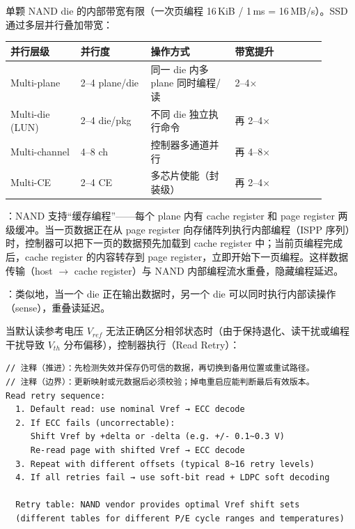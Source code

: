 单颗 NAND die 的内部带宽有限（一次页编程 16\,KiB / 1\,ms = 16\,MB/s）。SSD 通过多层并行叠加带宽：

\begin{longtable}{L{0.2\linewidth}L{0.2\linewidth}L{0.24\linewidth}L{0.26\linewidth}}
\toprule
并行层级 & 并行度 & 操作方式 & 带宽提升 \\
\midrule
Multi-plane & 2--4 plane/die & 同一 die 内多 plane 同时编程/读 & 2--4$\times$ \\\tablerowrule
Multi-die (LUN) & 2--4 die/pkg & 不同 die 独立执行命令 & 再 2--4$\times$ \\\tablerowrule
Multi-channel & 4--8 ch & 控制器多通道并行 & 再 4--8$\times$ \\\tablerowrule
Multi-CE & 2--4 CE & 多芯片使能（封装级） & 再 2--4$\times$ \\
\bottomrule
\end{longtable}

：NAND 支持“缓存编程”——每个 plane 内有 cache register 和 page register 两级缓冲。当一页数据正在从 page register 向存储阵列执行内部编程（ISPP 序列）时，控制器可以把下一页的数据预先加载到 cache register 中；当前页编程完成后，cache register 的内容转存到 page register，立即开始下一页编程。这样数据传输（host $\to$ cache register）与 NAND 内部编程流水重叠，隐藏编程延迟。

：类似地，当一个 die 正在输出数据时，另一个 die 可以同时执行内部读操作（sense），重叠读延迟。



当默认读参考电压 $V_{ref}$ 无法正确区分相邻状态时（由于保持退化、读干扰或编程干扰导致 $V_{th}$ 分布偏移），控制器执行（Read Retry）：

\begin{lstlisting}
// 注释（推进）：先检测失效并保存仍可信的数据，再切换到备用位置或重试路径。
// 注释（边界）：更新映射或元数据后必须校验；掉电重启应能判断最后有效版本。
Read retry sequence:
  1. Default read: use nominal Vref → ECC decode
  2. If ECC fails (uncorrectable):
     Shift Vref by +delta or -delta (e.g. +/- 0.1~0.3 V)
     Re-read page with shifted Vref → ECC decode
  3. Repeat with different offsets (typical 8~16 retry levels)
  4. If all retries fail → use soft-bit read + LDPC soft decoding

  Retry table: NAND vendor provides optimal Vref shift sets
  (different tables for different P/E cycle ranges and temperatures)
\end{lstlisting}

